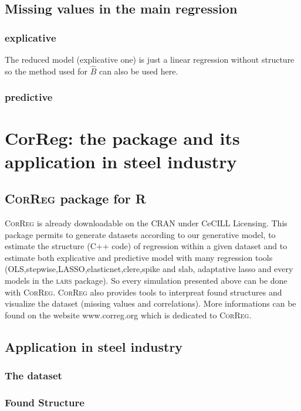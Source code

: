 \documentclass[11pt,a4paper]{report}
\begin{document}
	\section{Missing values in the main regression}
		\subsection{explicative}
			The reduced model (explicative one) is just a linear regression without structure so the method used for $\hat{B}$ can also be used here. 
		\subsection{predictive}
			
\chapter{CorReg: the package and its application in steel industry}	
	\section{\textsc{CorReg} package for R}
	\textsc{CorReg} is already downloadable on the CRAN under CeCILL Licensing. This package permits to generate datasets according to our generative model, to estimate the structure (C++ code) of regression within a given dataset and to estimate both explicative and predictive model with many regression tools (OLS,stepwise,LASSO,elasticnet,clere,spike and slab, adaptative lasso and every models in the \textsc{lars} package). So every simulation presented above can be done with \textsc{CorReg}.
	\textsc{CorReg} also provides tools to interpreat found structures and visualize the dataset (missing values and correlations). More informations can be found on the website www.correg.org which is dedicated to \textsc{CorReg}.
	\section{Application in steel industry}
		\subsection{The dataset}
		\subsection{Found Structure}
\end{document}
